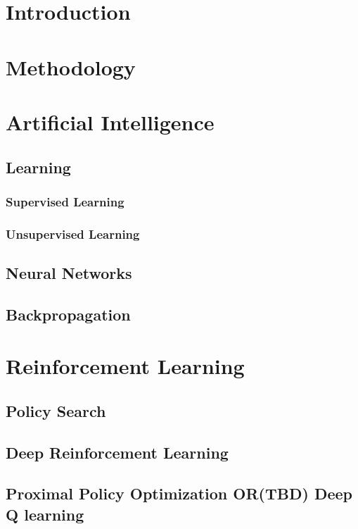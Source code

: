 \chapter{Introduction}

\chapter{Methodology}


\chapter{Artificial Intelligence}

\section{Learning}

\subsection{Supervised Learning}
\subsection{Unsupervised Learning}
\section{Neural Networks}
\section{Backpropagation}

\chapter{Reinforcement Learning}
\section{Policy Search}
\section{Deep Reinforcement Learning}

\section{Proximal Policy Optimization OR(TBD) Deep Q learning}

